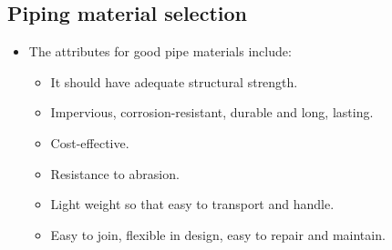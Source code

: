 \subsection{Piping material selection}
\begin{itemize}
\item The attributes for good pipe materials include:
\begin{itemize}
\item It should have adequate structural strength.

\item Impervious, corrosion-resistant, durable and long, lasting.

\item Cost-effective.

\item Resistance to abrasion.

\item Light weight so that easy to transport and handle.

\item Easy to join, flexible in design, easy to repair and maintain.


\end{itemize}
\end{itemize}
